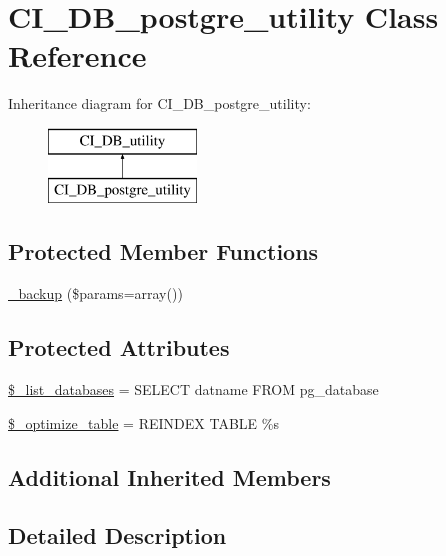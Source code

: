 \hypertarget{class_c_i___d_b__postgre__utility}{}\section{C\+I\+\_\+\+D\+B\+\_\+postgre\+\_\+utility Class Reference}
\label{class_c_i___d_b__postgre__utility}
Inheritance diagram for C\+I\+\_\+\+D\+B\+\_\+postgre\+\_\+utility\+:\begin{figure}[H]
\begin{center}
\leavevmode
\includegraphics[height=2.000000cm]{class_c_i___d_b__postgre__utility}
\end{center}
\end{figure}
\subsection*{Protected Member Functions}
\begin{DoxyCompactItemize}
\item 
\mbox{\hyperlink{class_c_i___d_b__postgre__utility_a30f3053d2c82e7562349924363507afa}{\+\_\+backup}} (\$params=array())
\end{DoxyCompactItemize}
\subsection*{Protected Attributes}
\begin{DoxyCompactItemize}
\item 
\mbox{\hyperlink{class_c_i___d_b__postgre__utility_afe3a5b80562d93d6bc7e2b53c95b7e5a}{\$\+\_\+list\+\_\+databases}} = \textquotesingle{}S\+E\+L\+E\+CT datname F\+R\+OM pg\+\_\+database\textquotesingle{}
\item 
\mbox{\hyperlink{class_c_i___d_b__postgre__utility_a083199e5c22c78912dae0a47bb2d7fad}{\$\+\_\+optimize\+\_\+table}} = \textquotesingle{}R\+E\+I\+N\+D\+EX T\+A\+B\+LE \%s\textquotesingle{}
\end{DoxyCompactItemize}
\subsection*{Additional Inherited Members}


\subsection{Detailed Description}


